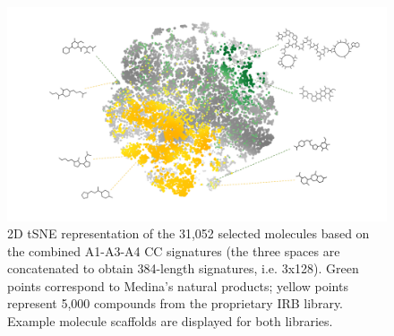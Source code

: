 \setcounter{section}{2} %
\setcounter{figure}{0}  %
\label{Navigation_SupplementaryInformation}




\begin{figure}[htbp]
  \centering
  \includegraphics[width=1\linewidth]{figures/Navigation/Supplementary/Medina_v.2.png}
  \caption{2D tSNE representation of the 31,052 selected molecules based on the combined A1-A3-A4 CC signatures (the three spaces are concatenated to obtain 384-length signatures, i.e. 3x128). Green points correspond to Medina’s natural products; yellow points represent 5,000 compounds from the proprietary IRB library. Example molecule scaffolds are displayed for both libraries.
  }
  \label{Navigation_FigS1}
\end{figure}


